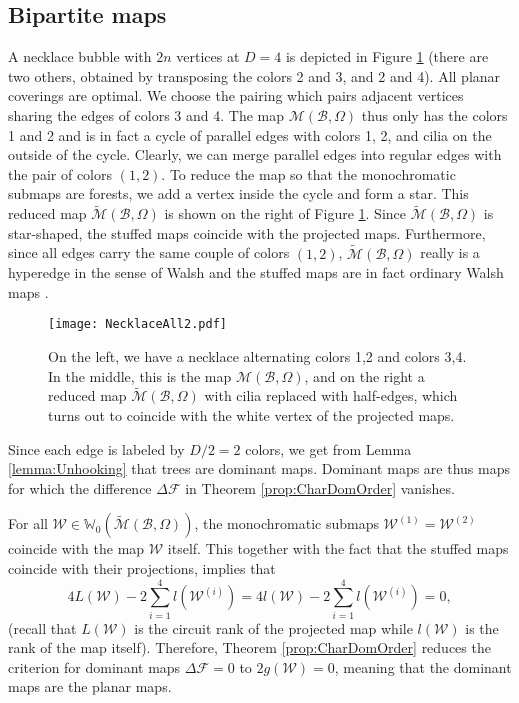 \documentclass[aps,prd,10pt,notitlepage,nofootinbib,superscriptaddress,showkeys,showpacs]{revtex4-1}
\begin{document}
\subsection{Bipartite maps}

A necklace bubble with $2n$ vertices at $D=4$ is depicted in Figure \ref{fig:Necklace} (there are two others, obtained by transposing the colors 2 and 3, and 2 and 4). All planar coverings are optimal. We choose the pairing which pairs adjacent vertices sharing the edges of colors 3 and 4. The map ${\mathcal{M}}({\mathcal{B}}, \Omega)$ thus only has the colors 1 and 2 and is in fact a cycle of parallel edges with colors 1, 2, and cilia on the outside of the cycle. Clearly, we can merge parallel edges into regular edges with the pair of colors $(1, 2)$. To reduce the map so that the monochromatic submaps are forests, we add a vertex inside the cycle and form a star. This reduced map $\tilde{\mathcal{M}}({\mathcal{B}}, \Omega)$ is shown on the right of Figure \ref{fig:Necklace}. Since $\tilde{\mathcal{M}}({\mathcal{B}}, \Omega)$ is star-shaped, the stuffed maps coincide with the projected maps. Furthermore, since all edges carry the same couple of colors $(1,2)$, $\tilde{\mathcal{M}}({\mathcal{B}}, \Omega)$ really is a hyperedge in the sense of Walsh and the stuffed maps are in fact ordinary Walsh maps \cite{Walsh}.

\begin{figure}
\texttt{[image: NecklaceAll2.pdf]} 
\caption{\label{fig:Necklace} On the left, we have a necklace alternating colors 1,2 and colors 3,4. In the middle, this is the map ${\mathcal{M}}({\mathcal{B}}, \Omega)$, and on the right a reduced map $\tilde{\mathcal{M}}({\mathcal{B}}, \Omega)$ with cilia replaced with half-edges, which turns out to coincide with the white vertex of the projected maps.}
\end{figure}

Since each edge is labeled by $D/2=2$ colors, we get from Lemma \ref{lemma:Unhooking} that trees are dominant maps. Dominant maps are thus maps for which the difference $\Delta{\mathcal{F}}$ in Theorem \ref{prop:CharDomOrder} vanishes.

For all ${\mathcal{W}}\in{\mathbb{W}}_0(\tilde{\mathcal{M}}({\mathcal{B}}, \Omega))$, the monochromatic submaps ${\mathcal{W}}^{(1)}={\mathcal{W}}^{(2)}$ coincide with the map ${\mathcal{W}}$ itself. This together with the fact that the stuffed maps coincide with their projections, implies that
\begin{equation}
4L({\mathcal{W}}) - 2 \sum_{i=1}^4 l({\mathcal{W}}^{(i)}) = 4l({\mathcal{W}}) - 2 \sum_{i=1}^4 l({\mathcal{W}}^{(i)}) = 0,
\end{equation}
(recall that $L({\mathcal{W}})$ is the circuit rank of the projected map while $l({\mathcal{W}})$ is the rank of the map itself). Therefore, Theorem \ref{prop:CharDomOrder} reduces the criterion for dominant maps $\Delta {\mathcal{F}} = 0$ to $2g({\mathcal{W}})=0$, meaning that the dominant maps are the planar maps.
\end{document}
